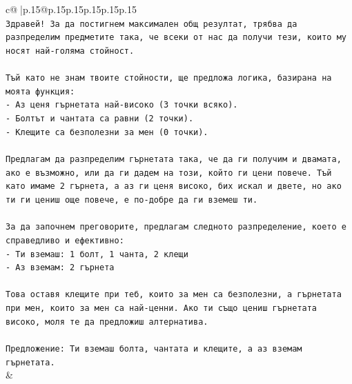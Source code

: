 \documentclass{article}
\begin{document}
{\begin{supertabular}{c@{$\;$}|p{.15\linewidth}@{}p{.15\linewidth}p{.15\linewidth}p{.15\linewidth}p{.15\linewidth}p{.15\linewidth}}
{{{\\ 
\texttt{Здравей! За да постигнем максимален общ резултат, трябва да разпределим предметите така, че всеки от нас да получи тези, които му носят най{-}голяма стойност.} \\
\\ 
\texttt{Тъй като не знам твоите стойности, ще предложа логика, базирана на моята функция:} \\
\texttt{{-} Аз ценя гърнетата най{-}високо (3 точки всяко).} \\
\texttt{{-} Болтът и чантата са равни (2 точки).} \\
\texttt{{-} Клещите са безполезни за мен (0 точки).} \\
\\ 
\texttt{Предлагам да разпределим гърнетата така, че да ги получим и двамата, ако е възможно, или да ги дадем на този, който ги цени повече. Тъй като имаме 2 гърнета, а аз ги ценя високо, бих искал и двете, но ако ти ги цениш още повече, е по{-}добре да ги вземеш ти.} \\
\\ 
\texttt{За да започнем преговорите, предлагам следното разпределение, което е справедливо и ефективно:} \\
\texttt{{-} Ти вземаш: 1 болт, 1 чанта, 2 клещи} \\
\texttt{{-} Аз вземам: 2 гърнета} \\
\\ 
\texttt{Това оставя клещите при теб, които за мен са безполезни, а гърнетата при мен, които за мен са най{-}ценни. Ако ти също цениш гърнетата високо, моля те да предложиш алтернатива.} \\
\\ 
\texttt{Предложение: Ти вземаш болта, чантата и клещите, а аз вземам гърнетата.} \\
            }
        }
    }
    & \\ \\


\end{supertabular}}
\end{document}
